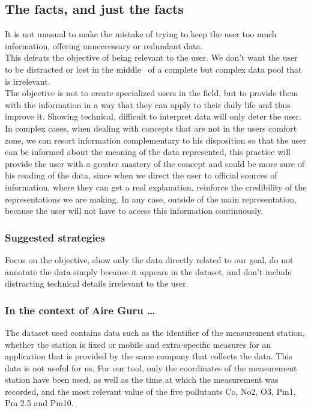 \subsection{The facts, and just the facts}

It is not unusual to make the mistake of trying to keep the user too much information, offering unneccessary or redundant data.\\
 
This defeats the objective of being relevant to the user. We don't want the user to be distracted or lost in the middle
 of a complete but complex data pool that is irrelevant.\\

The objective is not to create specialized users in the field, but to provide them with the
information in a way that they can apply to their daily life and thus improve it. Showing
technical, difficult to interpret data will only deter the user. \\

In complex cases, when dealing with concepts that are not in the users comfort zone, we can resort information
complementary to his disposition so that the user can be informed about the meaning of the data
represented, this practice will provide the user with a greater mastery of the concept and could be more
sure of his reading of the data, since when we direct the user to official sources of information, where they can
get a real explanation, reinforce the credibility of the representations we are making. In any case,
outside of the main representation, because the user will not have to access this information continuously.\\

\subsubsection*{Suggested strategies}

Focus on the objective, show only the data directly related to our goal, do not annotate the data
simply because it appears in the dataset, and don't include distracting technical details irrelevant to the user.

\subsubsection*{In the context of Aire Guru \ldots} 

The dataset used contains data such as the identifier of the measurement station, whether the station is fixed or mobile
and extra-specific measures for an application that is provided by the same company that collects the data. This data is not useful for us.
For our tool, only the coordinates of the measurement station have been used, as well as the time at which the measurement was recorded, and the most relevant value of the five pollutants Co, No2, O3, Pm1, Pm 2.5 and Pm10.\\

